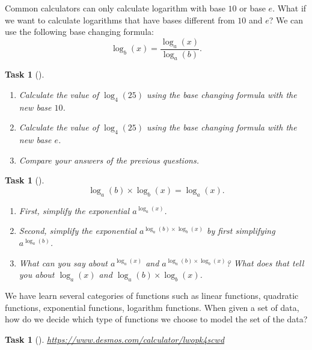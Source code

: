 \documentclass[10pt,]{article}
\theoremstyle{plain}
\newtheorem{proposition}[theorem]{Task}
\theoremstyle{definition}
\numberwithin{equation}{section}
\begin{document}
\hypertarget{p-90}{}%
Common calculators can only calculate logarithm with base \(10\) or base \(e\). What if we want to calculate logarithms that have bases different from \(10\) and \(e\)? We can use the following base changing formula:%
\begin{equation*}
\log_b(x) = \frac{\log_a(x)}{\log_a(b)}.
\end{equation*}
%
\begin{proposition}[{}]\label{proposition-35}
\leavevmode%
\begin{enumerate}
\item\hypertarget{li-178}{}Calculate the value of \(\log_4(25)\) using the base changing formula with the new base \(10\).%
\item\hypertarget{li-179}{}Calculate the value of \(\log_4(25)\) using the base changing formula with the new base \(e\).%
\item\hypertarget{li-180}{}Compare your answers of the previous questions.%
\end{enumerate}
\end{proposition}
\begin{proposition}[{}]\label{proposition-36}
%
\begin{equation*}
\log_a(b) \times \log_b(x) = \log_a(x).
\end{equation*}
\leavevmode%
\begin{enumerate}
\item\hypertarget{li-181}{}First, simplify the exponential \(a^{\log_a(x)}\).%
\item\hypertarget{li-182}{}Second, simplify the exponential \(a^{\log_a(b) \times \log_b(x)}\) by first simplifying \(a^{\log_a(b)}\).%
\item\hypertarget{li-183}{}What can you say about \(a^{\log_a(x)}\) and \(a^{\log_a(b) \times \log_b(x)}\)? What does that tell you about \(\log_a(x)\) and \(\log_a(b) \times \log_b(x)\).%
\end{enumerate}
\end{proposition}
\hypertarget{p-91}{}%
We have learn several categories of functions such as linear functions, quadratic functions, exponential functions, logarithm functions. When given a set of data, how do we decide which type of functions we choose to model the set of the data?%
\begin{proposition}[{}]\label{proposition-37}
\href{https://www.desmos.com/calculator/lwopk4scwd}{https://www.desmos.com/calculator/lwopk4scwd}\end{proposition}
\typeout{************************************************}
\typeout{************************************************}
\end{document}

